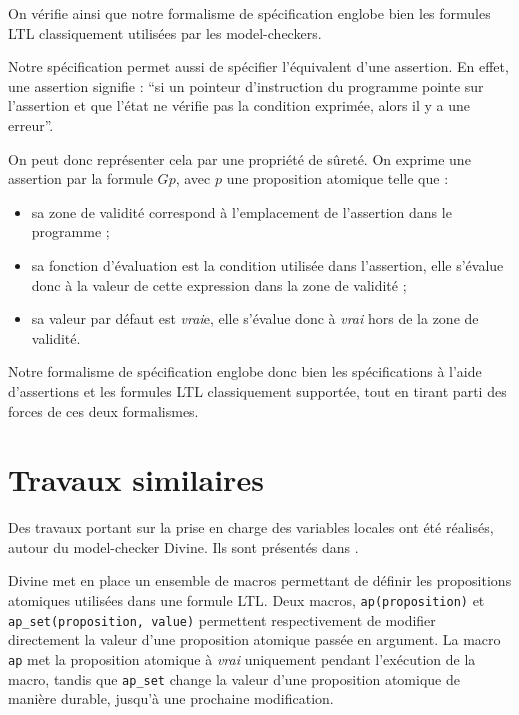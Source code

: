 On vérifie ainsi que notre formalisme de spécification englobe bien les formules
\ac{LTL} classiquement utilisées par les model-checkers.

Notre spécification permet aussi de spécifier l'équivalent d'une assertion. En
effet, une assertion signifie : ``si un pointeur d'instruction du
programme pointe sur l'assertion et que l'état ne vérifie pas la
condition exprimée, alors il y a une erreur''.

On peut donc représenter cela par une propriété de sûreté. On exprime
une assertion par la formule \(G p\), avec \(p\) une proposition
atomique telle que :

\begin{itemize}
\item
  sa zone de validité correspond à l'emplacement de l'assertion dans le
  programme ;
\item
  sa fonction d'évaluation est la condition utilisée dans l'assertion,
  elle s'évalue donc à la valeur de cette expression dans la zone de
  validité ;
\item
  sa valeur par défaut est \emph{vrai}e, elle s'évalue donc à \emph{vrai}
  hors de la zone de validité.
\end{itemize}

Notre formalisme de spécification englobe donc bien les spécifications à l'aide
d'assertions et les formules \ac{LTL} classiquement supportée, tout en tirant
parti des forces de ces deux formalismes.

\section{Travaux similaires}\label{sec:related_work}

Des travaux portant sur la prise en charge des variables locales ont été réalisés,
autour du model-checker Divine\cite{Divine_3_0}. Ils sont présentés dans
\cite{Divine_LTL}.

Divine met en place un ensemble de macros permettant de définir les propositions
atomiques utilisées dans une formule LTL. Deux macros, \texttt{ap(proposition)}
et \texttt{ap\_set(proposition, value)} permettent respectivement de modifier
directement la valeur d'une proposition atomique passée en argument. La macro \texttt{ap}
met la proposition atomique à \emph{vrai} uniquement pendant l'exécution de
la macro, tandis que \texttt{ap\_set} change la valeur d'une proposition
atomique de manière durable, jusqu'à une prochaine modification.

